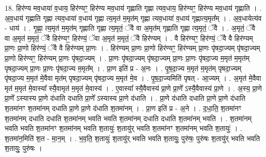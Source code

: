 \documentclass[17pt]{extarticle}
\begin{document}
18. हिर॑ण्य मव॒धाया॑ व॒धाय॒ हिर॑ण्यꣳ॒॒ हिर॑ण्य मव॒धाय॑ गृह्णाति गृह्णा त्यव॒धाय॒ हिर॑ण्यꣳ॒॒ हिर॑ण्य मव॒धाय॑ गृह्णाति । . अ॒व॒धाय॑ गृह्णाति गृह्णा त्यव॒धाया॑ व॒धाय॑ गृह्णा त्य॒मृत॑ म॒मृत॑म् गृह्णा त्यव॒धाया॑ व॒धाय॑ गृह्णात्य॒मृत᳚म् । . अ॒व॒धायेत्य॑व - धाय॑ । . गृ॒ह्णा॒ त्य॒मृत॑ म॒मृत॑म् गृह्णाति गृह्णा त्य॒मृतं॒ ॅवै वा अ॒मृत॑म् गृह्णाति गृह्णा त्य॒मृतं॒ ॅवै । . अ॒मृतं॒ ॅवै वा अ॒मृत॑ म॒मृतं॒ ॅवै हिर॑ण्यꣳ॒॒ हिर॑ण्यं॒ ॅवा अ॒मृत॑ म॒मृतं॒ ॅवै हिर॑ण्यम् । . वै हिर॑ण्यꣳ॒॒ हिर॑ण्यं॒ ॅवै वै हिर॑ण्यम् प्रा॒णः प्रा॒णो हिर॑ण्यं॒ ॅवै वै हिर॑ण्यम् प्रा॒णः । . हिर॑ण्यम् प्रा॒णः प्रा॒णो हिर॑ण्यꣳ॒॒ हिर॑ण्यम् प्रा॒णः पृ॑षदा॒ज्यम् पृ॑षदा॒ज्यम् प्रा॒णो हिर॑ण्यꣳ॒॒ हिर॑ण्यम् प्रा॒णः पृ॑षदा॒ज्यम् । . प्रा॒णः पृ॑षदा॒ज्यम् पृ॑षदा॒ज्यम् प्रा॒णः प्रा॒णः पृ॑षदा॒ज्य म॒मृत॑ म॒मृत॑म् पृषदा॒ज्यम् प्रा॒णः प्रा॒णः पृ॑षदा॒ज्य म॒मृत᳚म् । . प्रा॒ण इति॑ प्र - अ॒नः । . पृ॒ष॒दा॒ज्य म॒मृत॑ म॒मृत॑म् पृषदा॒ज्यम् पृ॑षदा॒ज्य म॒मृत॑ मे॒वैवा मृत॑म् पृषदा॒ज्यम् पृ॑षदा॒ज्य म॒मृत॑ मे॒व । . पृ॒ष॒दा॒ज्यमिति॑ पृषत् - आ॒ज्यम् । . अ॒मृत॑ मे॒वैवा मृत॑ म॒मृत॑ मे॒वास्या᳚ स्यै॒वामृत॑ म॒मृत॑ मे॒वास्य॑ । . ए॒वास्या᳚ स्यै॒वैवास्य॑ प्रा॒णे प्रा॒णे᳚ ऽस्यै॒वैवास्य॑ प्रा॒णे । . अ॒स्य॒ प्रा॒णे प्रा॒णे᳚ ऽस्यास्य प्रा॒णे द॑धाति दधाति प्रा॒णे᳚ ऽस्यास्य प्रा॒णे द॑धाति । . प्रा॒णे द॑धाति दधाति प्रा॒णे प्रा॒णे द॑धाति श॒तमा॑नꣳ श॒तमा॑नम् दधाति प्रा॒णे प्रा॒णे द॑धाति श॒तमा॑नम् । . प्रा॒ण इति॑ प्र - अ॒ने । . द॒धा॒ति॒ श॒तमा॑नꣳ श॒तमा॑नम् दधाति दधाति श॒तमा॑नम् भवति भवति श॒तमा॑नम् दधाति दधाति श॒तमा॑नम् भवति । . श॒तमा॑नम् भवति भवति श॒तमा॑नꣳ श॒तमा॑नम् भवति श॒तायुः॑ श॒तायु॑र् भवति श॒तमा॑नꣳ श॒तमा॑नम् भवति श॒तायुः॑ । . श॒तमा॑न॒मिति॑ श॒त - मा॒न॒म् । . भ॒व॒ति॒ श॒तायुः॑ श॒तायु॑र् भवति भवति श॒तायुः॒ पुरु॑षः॒ पुरु॑षः श॒तायु॑र् भवति भवति श॒तायुः॒ पुरु॑षः । \newline
\end{document}
